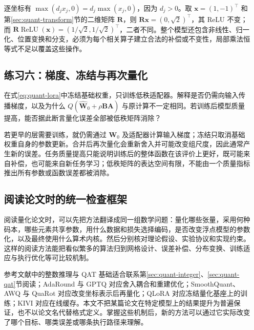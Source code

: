\documentclass[UTF8,12pt,a4paper,fontset=fandol]{ctexart}
\begin{document}
\begin{solve}
逐坐标有 $\max(d_jx_j,0)=d_j\max(x_j,0)$，因为 $d_j>0$。取 $\mathbf x=(1,-1)^\top$ 和第\ref{sec:quant-transform}节的二维矩阵 $\mathbf R$，则 $\mathbf R\mathbf x=(0,\sqrt2)^\top$，其 ReLU 不变；而 $\mathbf R\operatorname{ReLU}(\mathbf x)=(1/\sqrt2,1/\sqrt2)^\top$，二者不同。整个模型还包含非线性、归一化、位置变换和分支，必须为每个相关算子建立合法的补偿或不变性，局部乘法恒等式不足以覆盖这些操作。
\end{solve}

\subsection{练习六：梯度、冻结与再次量化}
在式\eqref{eq:quant-lora}中冻结基础权重，只训练低秩适配器。解释是否仍需向输入传播梯度，以及为什么 $Q(\widehat{\mathbf W}_0+\rho\mathbf B\mathbf A)$ 与原计算不一定相同。若训练后模型质量提高，能否据此断言量化误差全部被低秩矩阵消除？

\begin{solve}
若更早的层需要训练，就仍需通过 $\widehat{\mathbf W}_0$ 及适配器计算输入梯度；冻结只取消基础权重自身的参数更新。合并后再次量化会重新舍入并可能改变组尺度，因此通常产生新的误差。任务质量提高只能说明训练后的整体函数在该评价上更好，既可能来自补偿，也可能来自新任务学习；低秩矩阵的表达空间有限，不能由一个质量指标推出所有参数或函数误差都被消除。
\end{solve}

\subsection{阅读论文时的统一检查框架}
阅读量化论文时，可以先把方法翻译成同一组数学问题：量化哪些张量，采用何种码本，哪些元素共享参数，用什么数据和损失选择编码，是否改变浮点模型的参数化，以及最终使用什么算术内核。然后分别核对理论假设、实验协议和实现约束。这样的阅读方法能把看似繁多的算法归到网格设计、误差补偿、分布变换、训练适应与执行优化等可比较机制。

参考文献中的整数推理与 QAT 基础适合联系第\ref{sec:quant-integer}、\ref{sec:quant-qat}节阅读；AdaRound 与 GPTQ 对应舍入耦合和重建优化；SmoothQuant、AWQ 与 QuaRot 对应改变坐标表示后再量化；QLoRA 对应冻结量化基座上的训练；KIVI 对应在线缓存。本文不把某篇论文在特定模型上的结果提升为普遍保证，也不以论文名代替格式定义。掌握这些机制后，新的方法可以通过它实际改变了哪个目标、哪类误差或哪条执行路径来理解。
\end{document}
